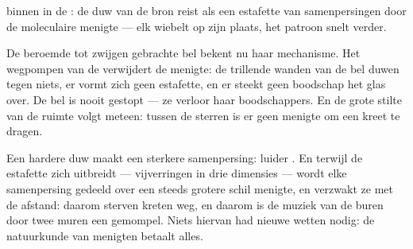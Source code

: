 \begin{omfigure}

{\small {} binnen in de : de duw van de bron reist als
een estafette van samenpersingen door de moleculaire menigte --- elk
 wiebelt op zijn plaats, het patroon snelt verder.}
\end{omfigure}

\begin{example}\label{ex:g7:sound-production:jar}
De beroemde tot zwijgen gebrachte bel bekent nu haar mechanisme. Het
wegpompen van de  verwijdert de menigte: de trillende wanden van
de bel duwen tegen niets, er vormt zich geen estafette, en er steekt
geen boodschap het glas over. De bel is nooit gestopt --- ze verloor
haar boodschappers. En de grote stilte van de ruimte volgt meteen:
tussen de sterren is er geen menigte om een kreet te dragen.
\end{example}

\begin{example}\label{ex:g7:sound-production:loud}
Een hardere duw maakt een sterkere samenpersing: luider
. En terwijl de estafette zich uitbreidt --- vijverringen in
drie dimensies --- wordt elke samenpersing gedeeld over een steeds
grotere schil menigte, en verzwakt ze met de afstand: daarom sterven
kreten weg, en daarom is de muziek van de buren door twee muren een
gemompel. Niets hiervan had nieuwe wetten nodig: de natuurkunde van
menigten betaalt alles.
\end{example}

